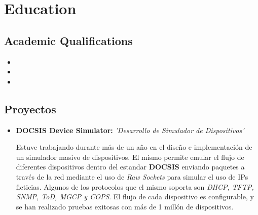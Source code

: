 \documentclass[11pt,a4paper,sans]{moderncv}        %
\begin{document}
\section{Education}

\vspace{5pt}

\subsection{Academic Qualifications}

\vspace{5pt}

\begin{itemize}

\item{}

\item{}  %

\item{}

\end{itemize}

\vspace{2pt}

\subsection{Proyectos}

\vspace{5pt}

\begin{itemize}

\item{\textbf{DOCSIS Device Simulator:} \textit{'Desarrollo de Simulador de Dispositivos'}

\vspace{3pt}

\small{Estuve trabajando durante más de un año en el diseño e implementación de un simulador masivo de dispositivos. El mismo permite emular el flujo de diferentes dispositivos dentro del estandar \textbf{DOCSIS} enviando paquetes a través de la red mediante el uso de \textit{Raw Sockets} para simular el uso de IPs ficticias. Algunos de los protocolos que el mismo soporta son \textit{DHCP, TFTP, SNMP, ToD, MGCP y COPS}. El flujo de cada dispositivo es configurable, y se han realizado pruebas exitosas con más de 1 millón de dispositivos. }}
\end{itemize}
\end{document}
